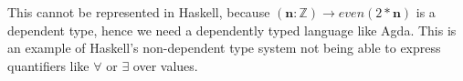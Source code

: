 \documentclass[12pt,twoside]{report}
\begin{document}
This cannot be represented in Haskell, because $(\textbf{n}: \mathbb{Z}) \rightarrow even(2 * \textbf{n})$ is a dependent type, hence we need a dependently typed language like Agda. This is an example of Haskell's non-dependent type system not being able to express quantifiers like $\forall$ or $\exists$ over values.


\end{document}
